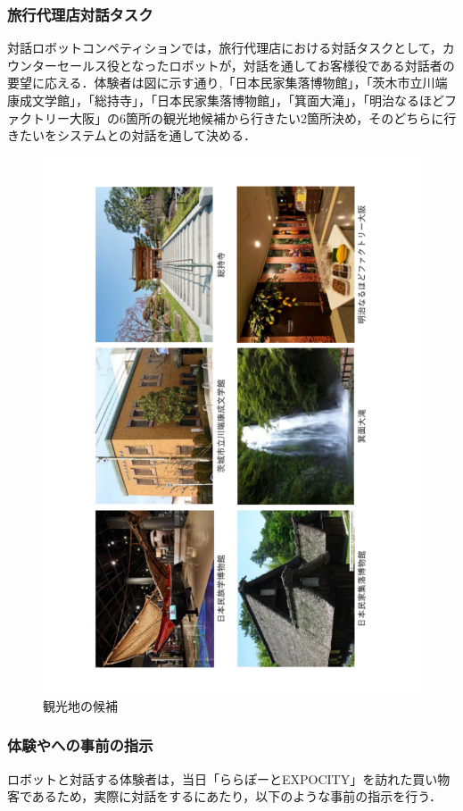 \subsubsection{旅行代理店対話タスク}
対話ロボットコンペティションでは，旅行代理店における対話タスクとして，カウンターセールス役となったロボットが，対話を通してお客様役である対話者の要望に応える．体験者は図\label{6place}に示す通り,「日本民家集落博物館」，「茨木市立川端康成文学館」，「総持寺」，「日本民家集落博物館」，「箕面大滝」，「明治なるほどファクトリー大阪」の6箇所の観光地候補から行きたい2箇所決め，そのどちらに行きたいをシステムとの対話を通して決める．
\begin{figure}[th]
    \centering
    \includegraphics[scale=0.5,angle=270]{pic/6place.pdf}
    \caption{観光地の候補}
    \label{6place}
\end{figure}

\subsubsection{体験やへの事前の指示}
ロボットと対話する体験者は，当日「ららぽーとEXPOCITY」を訪れた買い物客であるため，実際に対話をするにあたり，以下のような事前の指示を行う．

